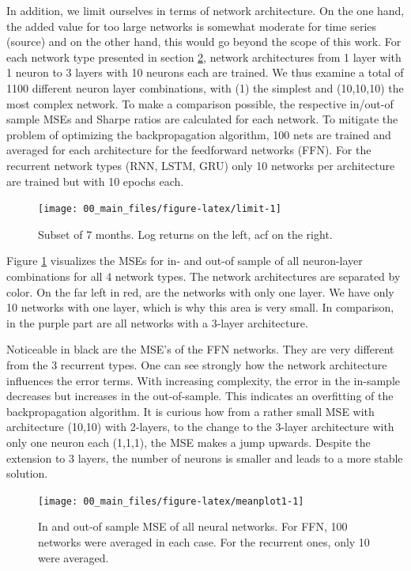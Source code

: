 \documentclass[
]{article}
\begin{document}
In addition, we limit ourselves in terms of network architecture. On the
one hand, the added value for too large networks is somewhat moderate
for time series (source) and on the other hand, this would go beyond the
scope of this work. For each network type presented in section
\protect\hyperlink{theory}{2}, network architectures from 1 layer with 1
neuron to 3 layers with 10 neurons each are trained. We thus examine a
total of 1100 different neuron layer combinations, with (1) the simplest
and (10,10,10) the most complex network. To make a comparison possible,
the respective in/out-of sample MSEs and Sharpe ratios are calculated
for each network. To mitigate the problem of optimizing the
backpropagation algorithm, 100 nets are trained and averaged for each
architecture for the feedforward networks (FFN). For the recurrent
network types (RNN, LSTM, GRU) only 10 networks per architecture are
trained but with 10 epochs each.

\begin{figure}

{\centering \texttt{[image: 00\_main\_files/figure-latex/limit-1]} 

}

\caption{Subset of 7 months. Log returns on the left, acf on the right.}\label{fig:limit}
\end{figure}

Figure \ref{fig:limit} visualizes the MSEs for in- and out-of sample of
all neuron-layer combinations for all 4 network types. The network
architectures are separated by color. On the far left in red, are the
networks with only one layer. We have only 10 networks with one layer,
which is why this area is very small. In comparison, in the purple part
are all networks with a 3-layer architecture.

\newpage

Noticeable in black are the MSE's of the FFN networks. They are very
different from the 3 recurrent types. One can see strongly how the
network architecture influences the error terms. With increasing
complexity, the error in the in-sample decreases but increases in the
out-of-sample. This indicates an overfitting of the backpropagation
algorithm. It is curious how from a rather small MSE with architecture
(10,10) with 2-layers, to the change to the 3-layer architecture with
only one neuron each (1,1,1), the MSE makes a jump upwards. Despite the
extension to 3 layers, the number of neurons is smaller and leads to a
more stable solution.

\begin{figure}

{\centering \texttt{[image: 00\_main\_files/figure-latex/meanplot1-1]} 

}

\caption{In and out-of sample MSE of all neural networks. For FFN, 100 networks were averaged in each case. For the recurrent ones, only 10 were averaged.}\label{fig:meanplot1}
\end{figure}
\end{document}
